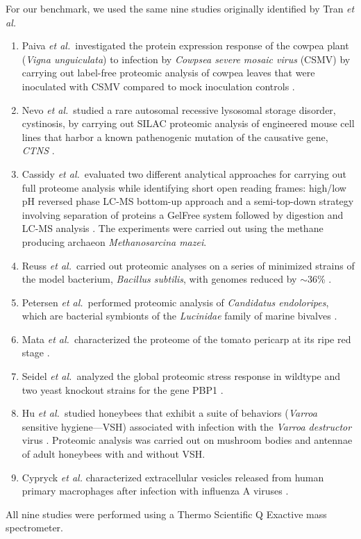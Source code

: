 \documentclass{article}
\begin{document}
For our benchmark, we used the same nine studies originally identified by Tran {\em et al.} \cite{tran2017denovo}
\begin{enumerate}
\item Paiva \textit{et al.}\ investigated the protein expression response of the cowpea plant (\textit{Vigna unguiculata}) to infection by \textit{Cowpsea severe mosaic virus} (CSMV) by carrying out label-free proteomic analysis of cowpea leaves that were inoculated with CSMV compared to mock inoculation controls \cite{paiva2016label}.
\item Nevo \textit{et al.}\ studied a rare autosomal recessive lysosomal storage disorder, cystinosis, by carrying out SILAC proteomic analysis of engineered mouse cell lines that harbor a known pathenogenic mutation of the causative gene, \textit{CTNS} \cite{nevo2017impact}.
\item Cassidy \textit{et al.}\ evaluated two different analytical approaches for carrying out full proteome analysis while identifying short open reading frames: high/low pH reversed phase LC-MS bottom-up approach and a semi-top-down strategy involving separation of proteins a GelFree system followed by digestion and LC-MS analysis \cite{cassidy2016combination}. The experiments were carried out using the methane producing archaeon \textit{Methanosarcina mazei}.
\item Reuss \textit{et al.}\ carried out proteomic analyses on a series of minimized strains of the model bacterium, \textit{Bacillus subtilis}, with genomes reduced by $\sim$36\% \cite{reuss2017large}.
\item Petersen \textit{et al.}\ performed proteomic analysis of \textit{Candidatus endoloripes}, which are bacterial symbionts of the \textit{Lucinidae} family of marine bivalves \cite{petersen2016chemosynthetic}.
\item Mata \textit{et al.}\ characterized the proteome of the tomato pericarp at its ripe red stage \cite{mata2017depth}.
\item Seidel \textit{et al.}\ analyzed the global proteomic stress response in wildtype and two yeast knockout strains for the gene PBP1  \cite{seidel2017quantitative}.
\item Hu \textit{et al.}\ studied honeybees that exhibit a suite of behaviors (\textit{Varroa} sensitive hygiene---VSH) associated with infection with the \textit{Varroa destructor} virus \cite{hu2016proteome}.  Proteomic analysis was carried out on mushroom bodies and antennae of adult honeybees with and without VSH.
\item Cypryck \textit{et al.} characterized extracellular vesicles released from human primary macrophages after infection with influenza A viruses \cite{cypryk2017proteomic}.
\end{enumerate}
All nine studies were performed using a Thermo Scientific Q Exactive mass spectrometer.
\end{document}
